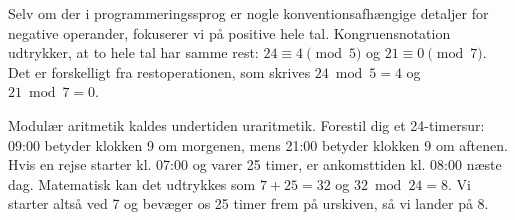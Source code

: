 Selv om der i programmeringssprog er nogle konventionsafhængige detaljer for negative operander, fokuserer vi på positive hele tal. Kongruensnotation udtrykker, at to hele tal har samme rest: $24\equiv4\pmod 5$ og $21\equiv0\pmod 7$. Det er forskelligt fra restoperationen, som skrives $24\bmod5=4$ og $21\bmod7=0$.

Modulær aritmetik kaldes undertiden uraritmetik. Forestil dig et 24-timersur: 09:00 betyder klokken 9 om morgenen, mens 21:00 betyder klokken 9 om aftenen. Hvis en rejse starter kl. 07:00 og varer 25 timer, er ankomsttiden kl. 08:00 næste dag. Matematisk kan det udtrykkes som \(7 + 25 = 32\) og \(32 \bmod 24 = 8\). Vi starter altså ved 7 og bevæger os 25 timer frem på urskiven, så vi lander på 8.
